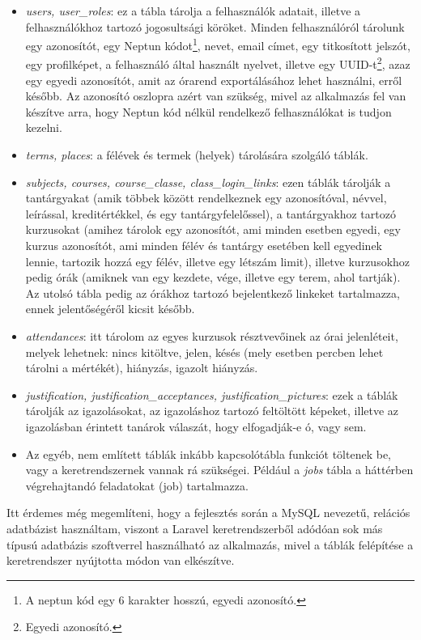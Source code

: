 \documentclass[
]{thesis-ekf}
\theoremstyle{definition}
\theoremstyle{remark}
\begin{document}
\begin{itemize}
	\item \emph{users, user\_roles}: ez a tábla tárolja a felhasználók adatait, illetve a felhasználókhoz tartozó jogosultsági köröket. Minden felhasználóról tárolunk egy azonosítót, egy Neptun\cite{Neptun} kódot\footnote{A neptun kód egy 6 karakter hosszú, egyedi azonosító.}, nevet, email címet, egy titkosított jelszót, egy profilképet, a felhasználó által használt nyelvet, illetve egy UUID-t\footnote{Egyedi azonosító.}, azaz egy egyedi azonosítót, amit az órarend exportálásához lehet használni, erről később. Az azonosító oszlopra azért van szükség, mivel az alkalmazás fel van készítve arra, hogy Neptun kód nélkül rendelkező felhasználókat is tudjon kezelni.
	\item \emph{terms, places}: a félévek és termek (helyek) tárolására szolgáló táblák.
	\item \emph{subjects, courses, course\_classe, class\_login\_links}: ezen táblák tárolják a tantárgyakat (amik többek között rendelkeznek egy azonosítóval, névvel, leírással, kreditértékkel, és egy tantárgyfelelőssel), a tantárgyakhoz tartozó kurzusokat (amihez tárolok egy azonosítót, ami minden esetben egyedi, egy kurzus azonosítót, ami minden félév és tantárgy esetében kell egyedinek lennie, tartozik hozzá egy félév, illetve egy létszám limit), illetve kurzusokhoz pedig órák (amiknek van egy kezdete, vége, illetve egy terem, ahol tartják). Az utolsó tábla pedig az órákhoz tartozó bejelentkező linkeket tartalmazza, ennek jelentőségéről kicsit később.
	\item  \emph{attendances}: itt tárolom az egyes kurzusok résztvevőinek az órai jelenléteit, melyek lehetnek: nincs kitöltve, jelen, késés (mely esetben percben lehet tárolni a mértékét), hiányzás, igazolt hiányzás.
	\item \emph{justification, justification\_acceptances, justification\_pictures}: ezek a táblák tárolják az igazolásokat, az igazoláshoz tartozó feltöltött képeket, illetve az igazolásban érintett tanárok válaszát, hogy elfogadják-e ó, vagy sem.
	\item Az egyéb, nem említett táblák inkább kapcsolótábla funkciót töltenek be, vagy a keretrendszernek vannak rá szükségei. Például a \emph{jobs} tábla a háttérben végrehajtandó feladatokat (job) tartalmazza.
\end{itemize}

Itt érdemes még megemlíteni, hogy a fejlesztés során a MySQL nevezetű, relációs adatbázist használtam, viszont a Laravel keretrendszerből adódóan sok más típusú adatbázis szoftverrel használható az alkalmazás, mivel a táblák felépítése a keretrendszer nyújtotta módon van elkészítve.
\end{document}

